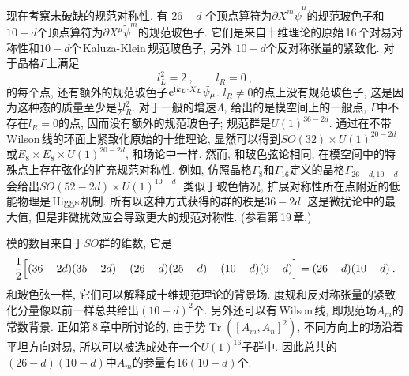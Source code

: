 现在考察未破缺的规范对称性. 有 $26{-}d$ 个顶点算符为$ \partial X^{m}\tilde{\psi}^{\mu} $的规范玻色子和$ 10{-}d $个顶点算符为$ \partial X^{\mu}\tilde{\psi}^{m} $的规范玻色子.  它们是来自十维理论的原始\,16\,个对易对称性和$ 10-d $个\,Kaluza-Klein\,规范玻色子, 另外 $10-d $个反对称张量的紧致化. 对于晶格$ \Gamma $上满足
\begin{equation}
l_{L}^{2}=2 \:, \qquad l_{R}=0 \:, \label{11.6.15}    
\end{equation}
的每个点, 还有额外的规范玻色子$ \mathrm{e}^{\mathrm{i} k_{L}\cdot X_{L}}\tilde{\psi}_{\mu}$. $l_{R}\neq 0 $的点上没有规范玻色子, 这是因为这种态的质量至少是$ \frac{1}{2}l_{R}^{2}$. 对于一般的增速$ \Lambda$, 给出的是模空间上的一般点, $\Gamma $中不存在$ l_{R}=0 $的点, 因而没有额外的规范玻色子; 规范群是$ U(1)^{36-2d}$. 通过在不带\,Wilson\,线的环面上紧致化原始的十维理论, 显然可以得到$ SO(32)\times U(1)^{20-2d} $或$ E_{8}\times E_{8}\times U(1)^{20-2d}$, 和场论中一样. 然而, 和玻色弦论相同, 在模空间中的特殊点上存在弦化的扩充规范对称性. 例如, 仿照晶格$ \Gamma_{8} $和$ \Gamma_{16} $定义的晶格$ \Gamma_{26-d,10-d} $会给出$ SO(52-2d)\times U(1)^{10-d}$. 类似于玻色情况, 扩展对称性所在点附近的低能物理是\,Higgs\,机制. 所有以这种方式获得的群的秩是$ 36-2d$. 这是微扰论中的最大值, 但是非微扰效应会导致更大的规范对称性. (参看第\,19\,章.)

模的数目来自于$ SO $群的维数, 它是
\begin{equation}
    \frac{1}{2}\Bigl[(36-2d)(35-2d)-(26-d)(25-d)-(10-d)(9-d)\Bigr]=(26-d)(10-d) \:. \label{11.6.16}
\end{equation}
和玻色弦一样, 它们可以解释成十维规范理论的背景场. 度规和反对称张量的紧致化分量像以前一样总共给出$ (10-d)^{2} $个. 另外还可以有\,Wilson\,线, 即规范场$ A_{m} $的常数背景. 正如第\,8\,章中所讨论的, 由于势$ \operatorname{Tr}([A_{m},A_{n}]^{2})$, 不同方向上的场沿着平坦方向对易, 所以可以被选成处在一个$ U(1)^{16} $子群中. 因此总共的$ (26-d)(10-d) $中$ A_{m} $的参量有$ 16(10-d) $个.

